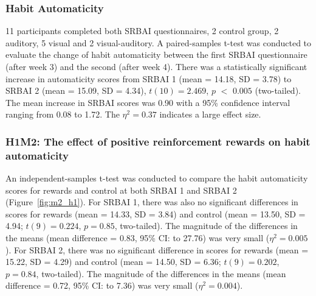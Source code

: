 \subsubsection*{Habit Automaticity}
11 participants completed both SRBAI questionnaires, 2 control group, 2 auditory, 5 visual and 2 visual-auditory. A paired-samples t-test was conducted to evaluate the change of habit automaticity between the first SRBAI questionnaire (after week 3) and the second (after week 4). There was a statistically significant increase in automaticity scores from SRBAI 1 (mean = 14.18, SD = 3.78) to SRBAI 2 (mean = 15.09, SD = 4.34), $t(10) = 2.469$, $p$ $<$ $0.005$ (two-tailed). The mean increase in SRBAI scores was 0.90 with a 95\% confidence interval ranging from 0.08 to 1.72. The $\eta^{2} = 0.37$ indicates a large effect size.

\subsubsection*{H1M2: The effect of positive reinforcement rewards on habit automaticity}
An independent-samples t-test was conducted to compare the habit automaticity scores
for rewards and control at both SRBAI 1 and SRBAI 2 (Figure~\ref{fig:m2_h1}). For SRBAI 1, there was also no significant differences in scores for rewards (mean = 14.33, SD = 3.84) and control (mean = 13.50, SD = 4.94; $t(9) = 0.224$, $p = 0.85$,
two-tailed). The magnitude of the differences in the means (mean difference = 0.83,
95\% CI:  to 27.76) was very small ($\eta^{2} = 0.005$). For SRBAI 2, there was no significant difference in scores for rewards
(mean = 15.22, SD = 4.29) and control (mean = 14.50, SD = 6.36; $t(9) = 0.202$, $p = 0.84$,
two-tailed). The magnitude of the differences in the means (mean difference = 0.72,
95\% CI:  to 7.36) was very small ($\eta^{2} = 0.004$).




